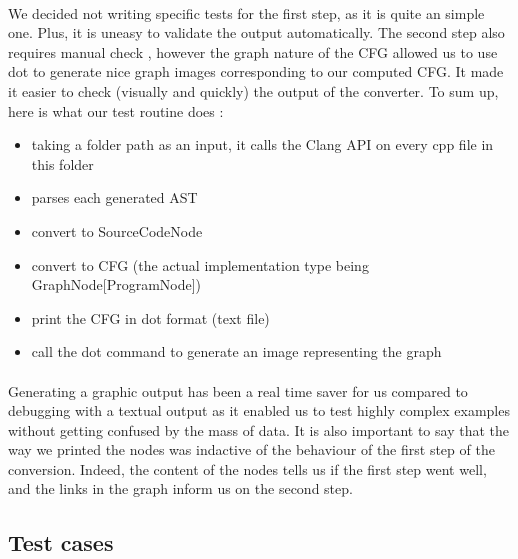 \documentclass{report}
\begin{document}
\paragraph{}
\hspace{4mm}\textnormal{We decided not writing specific tests for the first step, as it is quite an simple one. Plus, it is uneasy to
validate the output automatically. The second step also requires manual check , however the graph nature of the CFG allowed us to use dot to generate nice graph images
corresponding to our computed CFG. It made it easier to check (visually and quickly) the output of the converter.
To sum up, here is what our test routine does :}

\vspace{3mm}
\begin{itemize}
\item taking a folder path as an input, it calls the Clang API on every cpp file in this folder\vspace{1mm}
\item parses each generated AST\vspace{1mm}
\item convert to SourceCodeNode\vspace{1mm}
\item convert to CFG (the actual implementation type being 	GraphNode[ProgramNode])\vspace{1mm}
\item print the CFG in dot format (text file)\vspace{1mm}
\item call the dot command to generate an image representing the graph\vspace{1mm}
\end{itemize}

\paragraph{}
\hspace{4mm}\textnormal{Generating a graphic output has been a real time saver for us compared to debugging with a textual output as it enabled
us to test highly complex examples without getting confused by the mass of data. It is also important to say that
the way we printed the nodes was indactive of the behaviour of the first step of the conversion. Indeed, the content of the nodes
tells us if the first step went well, and the links in the graph inform us on the second step.}

\subsection{Test cases}
\end{document}
